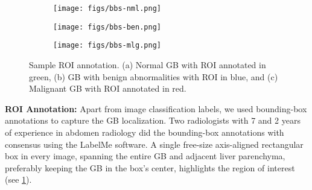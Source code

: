 \documentclass[10pt,twocolumn,letterpaper]{article}
\newcommand{\myfirstpara}[1]{\noindent \textbf{#1:}}
\begin{document}
\begin{figure}[h]
    \centering
     \begin{subfigure}[b]{0.32\linewidth}
		\centering
		\texttt{[image: figs/bbs-nml.png]}
		\caption{}
	\end{subfigure}
    \begin{subfigure}[b]{0.32\linewidth}
		\centering
		\texttt{[image: figs/bbs-ben.png]}
		\caption{}
	\end{subfigure}
    \begin{subfigure}[b]{0.32\linewidth}
		\centering
		\texttt{[image: figs/bbs-mlg.png]}
		\caption{}
	\end{subfigure}
   \caption{Sample ROI annotation. (a) Normal GB with ROI annotated in green, (b) GB with benign abnormalities with ROI in blue, and (c) Malignant GB with ROI annotated in red. }
    \label{fig:bb_sample}
\end{figure}
\myfirstpara{ROI Annotation} Apart from image classification labels, we used bounding-box annotations to capture the GB localization. Two radiologists with 7 and 2 years of experience in abdomen radiology did the bounding-box annotations with consensus using the LabelMe \cite{russell2008labelme} software. A single free-size axis-aligned rectangular box in every image, spanning the entire GB and adjacent liver parenchyma, preferably keeping the GB in the box's center, highlights the region of interest (see \cref{fig:bb_sample}).


\begin{table}[t]
	\centering
{}
	\caption{Model performances (10-fold cross-validation) for training with our proposed visual acuity-based curriculum.}
\label{tbl:curr_improve}
\end{table}
\end{document}
